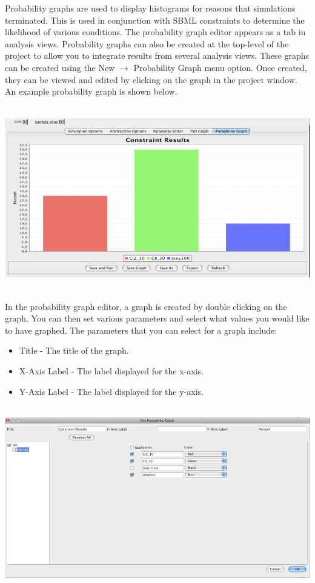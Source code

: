 \documentclass[titlepage,11pt]{article}
\begin{document}
\noindent
Probability graphs are used to display histograms for reasons that
simulations terminated.  This is used in conjunction with SBML constraints
to determine the likelihood of various conditions. 
The probability graph editor appears as a tab in analysis
views.  Probability graphs can also be created at the top-level of the project
to allow you to integrate results from several analysis views. 
These graphs can be created using the New $\rightarrow$ Probability Graph
menu option. Once created, they can be viewed and edited by
clicking on the graph in the project window.  An example probability
graph is shown below.
\begin{center}
\includegraphics[height=80mm]{screenshots/probGraph}
\end{center}

In the probability graph editor,
a graph is created by double clicking on the graph. You can then set
various parameters and select what values you would like to have
graphed. The parameters that you can select for a graph include: 
\begin{itemize}
\item Title - The title of the graph.
\item X-Axis Label - The label displayed for the x-axis. 
\item Y-Axis Label - The label displayed for the y-axis. 
\end{itemize}
\begin{center}
\includegraphics[height=80mm]{screenshots/editProbGraph}
\end{center}
\end{document}
